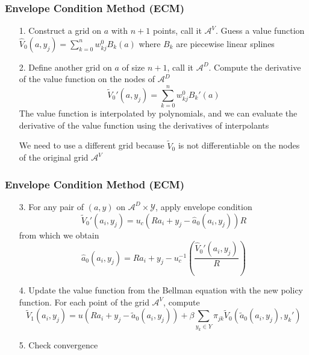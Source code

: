 \documentclass[aspectratio=169, 11pt]{beamer}
\begin{document}
\begin{frame}
\frametitle{Envelope Condition Method (ECM)}
  \begin{itemize}
    \bigskip
    \item[1.] Construct a grid on $a$ with $n+1$ points, call it $\mathcal{A}^{V}$. Guess a value function $\hat{V}_{0}\left(a,y_{j}\right)=\sum_{k=0}^{n}w_{kj}^{0}B_{k}\left(a\right)$ where $B_{k}$ are piecewise linear splines
    \bigskip
    \item[2.] Define another grid on $a$ of size $n+1$, call it $\mathcal{A}^{D}$. Compute the derivative of the value function on the nodes of $\mathcal{A}^{D}$
    \[
      \tilde{V}_{0}'\left(a,y_{j}\right)=\sum_{k=0}^{n}w_{kj}^{0}B_{k}'\left(a\right)
    \]
    The value function is interpolated by polynomials, and we can evaluate the derivative of the value function using the derivatives of interpolants \\
    \medskip

    We need to use a different grid because $\tilde{V}_{0}$ is not differentiable on the nodes of the original grid $\mathcal{A}^{V}$
  \end{itemize}
\end{frame}

\begin{frame}
\frametitle{Envelope Condition Method (ECM)}
  \begin{itemize}
    \item[3.] For any pair of $\left(a,y\right)$ on $\mathcal{A}^{D}\times\mathcal{Y}$, apply envelope condition
    \[
      \tilde{V}_{0}'\left(a_{i},y_{j}\right)=u_{c}\left(Ra_{i}+y_{j}-\hat{a}_{0}\left(a_{i},y_{j}\right)\right)R
    \]
    from which we obtain
    \[
      \hat{a}_{0}\left(a_{i},y_{j}\right)=Ra_{i}+y_{j}-u_{c}^{-1}\left(\frac{\hat{V}_{0}'\left(a_{i},y_{j}\right)}{R}\right)
    \]
    \medskip
    \item[4.] Update the value function from the Bellman equation with the new policy function. For each point of the grid $\mathcal{A}^{V}$, compute
    \[
      \tilde{V}_{1}\left(a_{i},y_{j}\right)=u\left(Ra_{i}+y_{j}-\tilde{a}_{0}\left(a_{i},y_{j}\right)\right)+\beta\sum_{y_{k}\in Y}\pi_{jk}\tilde{V}_{0}\left(\tilde{a}_{0}\left(a_{i},y_{j}\right),y_{k}'\right)
    \]
    \medskip
    \item[5.] Check convergence
  \end{itemize}
\end{frame}
\end{document}
